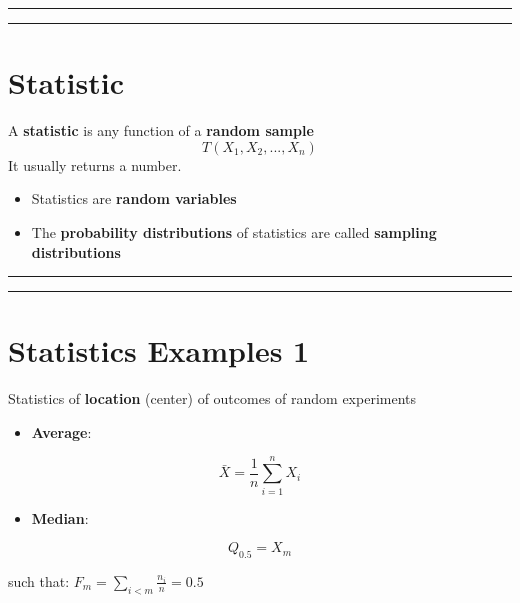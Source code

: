 \documentclass[
]{book}
\providecommand{\tightlist}{%
  \setlength{\itemsep}{0pt}\setlength{\parskip}{0pt}}
\begin{document}
\begin{center}\rule{0.5\linewidth}{0.5pt}\end{center}

\begin{center}\rule{0.5\linewidth}{0.5pt}\end{center}

\hypertarget{statistic}{%
\section{Statistic}\label{statistic}}

A \textbf{statistic} is any function of a \textbf{random sample}
\[T(X_1,X_2, ..., X_n)\]
It usually returns a number.

\begin{itemize}
\item
  Statistics are \textbf{random variables}
\item
  The \textbf{probability distributions} of statistics are called \textbf{sampling distributions}
\end{itemize}

\begin{center}\rule{0.5\linewidth}{0.5pt}\end{center}

\begin{center}\rule{0.5\linewidth}{0.5pt}\end{center}

\hypertarget{statistics-examples-1}{%
\section{Statistics Examples 1}\label{statistics-examples-1}}

Statistics of \textbf{location} (center) of outcomes of random experiments

\begin{itemize}
\tightlist
\item
  \textbf{Average}:
\end{itemize}

\[\bar{X}=\frac{1}{n}\sum_{i=1}^n X_i\]

\begin{itemize}
\tightlist
\item
  \textbf{Median}:
\end{itemize}

\[Q_{0.5}=X_m\]

such that: \(F_m=\sum_{i<m} \frac{n_i}{n}=0.5\)
\end{document}
